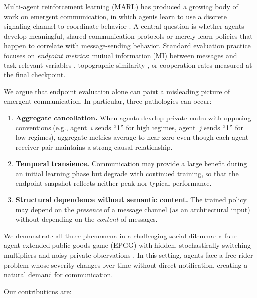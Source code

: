 \documentclass[
  10pt,
  letterpaper,
]{article}
\begin{document}
Multi-agent reinforcement learning (MARL) has produced a growing body of
work on emergent communication, in which agents learn to use a discrete
signaling channel to coordinate behavior
\citep{foerster2016learning, sukhbaatar2016learning, lazaridou2017multi}.
A central question is whether agents develop meaningful, shared
communication protocols or merely learn policies that happen to
correlate with message-sending behavior. Standard evaluation practice
focuses on \emph{endpoint metrics}: mutual information (MI) between
messages and task-relevant variables \citep{lowe2019pitfalls},
topographic similarity \citep{lazaridou2017multi}, or cooperation rates
measured at the final checkpoint.

We argue that endpoint evaluation alone can paint a misleading picture
of emergent communication. In particular, three pathologies can occur:

\begin{enumerate}[leftmargin=*,nosep]
  \item \textbf{Aggregate cancellation.} When agents develop private codes with opposing conventions (e.g., agent~$i$ sends ``1'' for high regimes, agent~$j$ sends ``1'' for low regimes), aggregate metrics average to near zero even though each agent--receiver pair maintains a strong causal relationship.
  \item \textbf{Temporal transience.} Communication may provide a large benefit during an initial learning phase but degrade with continued training, so that the endpoint snapshot reflects neither peak nor typical performance.
  \item \textbf{Structural dependence without semantic content.} The trained policy may depend on the \emph{presence} of a message channel (as an architectural input) without depending on the \emph{content} of messages.
\end{enumerate}

We demonstrate all three phenomena in a challenging social dilemma: a
four-agent extended public goods game (EPGG) with hidden, stochastically
switching multipliers and noisy private observations
\citep{orzan2024pgg}. In this setting, agents face a free-rider problem
whose severity changes over time without direct notification, creating a
natural demand for communication.

Our contributions are:
\end{document}
